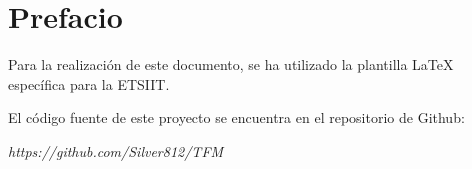 \chapter*{Prefacio}

Para la realización de este documento, se ha utilizado la plantilla \LaTeX \cite{guervos_jjplantilla-tfg-etsiit_2024} específica para la ETSIIT.

\vspace{20pt}

El código fuente de este proyecto se encuentra en el repositorio de Github:

\textit{https://github.com/Silver812/TFM}